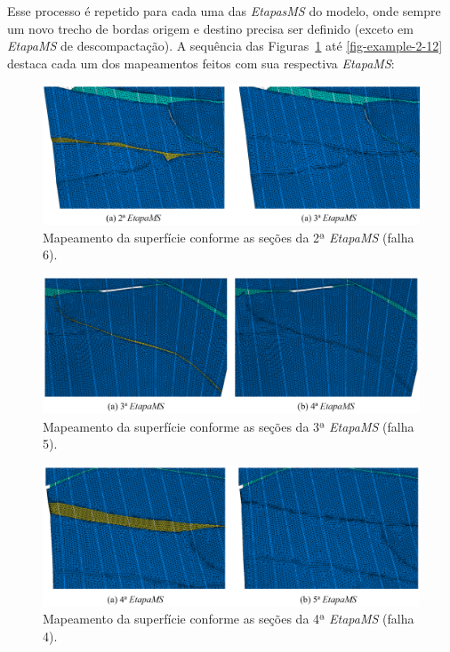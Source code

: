 Esse processo é repetido para cada uma das \textit{EtapasMS} do modelo, onde sempre um novo trecho de bordas origem e destino precisa ser definido (exceto em \textit{EtapaMS} de descompactação). A sequência das Figuras~\ref{fig-example-2-9} até \ref{fig-example-2-12} destaca cada um dos mapeamentos feitos com sua respectiva \textit{EtapaMS}:

\begin{figure} [H]
  \begin{center}
    \includegraphics[width=\textwidth]{images/fig-example-2-9}
    \caption{Mapeamento da superfície conforme as seções da 2ª \textit{EtapaMS} (falha 6).}\label{fig-example-2-9}
  \end{center}
\end{figure}

\begin{figure} [H]
  \begin{center}
    \includegraphics[width=\textwidth]{images/fig-example-2-10}
    \caption{Mapeamento da superfície conforme as seções da 3ª \textit{EtapaMS} (falha 5).}\label{fig-example-2-10}
  \end{center}
\end{figure}

\begin{figure} [H]
  \begin{center}
    \includegraphics[width=\textwidth]{images/fig-example-2-11}
    \caption{Mapeamento da superfície conforme as seções da 4ª \textit{EtapaMS} (falha 4).}\label{fig-example-2-11}
  \end{center}
\end{figure}


